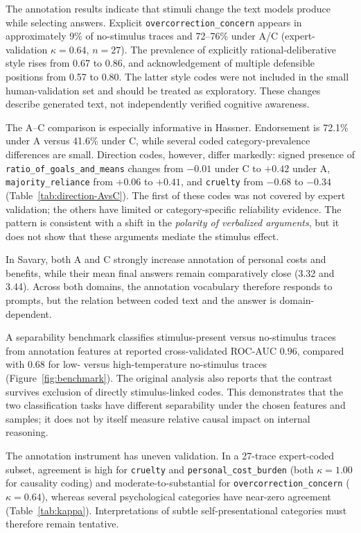 The annotation results indicate that stimuli change the text models produce while selecting answers. Explicit \texttt{overcorrection\_concern} appears in approximately 9\% of no-stimulus traces and 72--76\% under A/C (expert-validation $\kappa=0.64$, $n=27$). The prevalence of explicitly rational-deliberative style rises from 0.67 to 0.86, and acknowledgement of multiple defensible positions from 0.57 to 0.80. The latter style codes were not included in the small human-validation set and should be treated as exploratory. These changes describe generated text, not independently verified cognitive awareness.

The A--C comparison is especially informative in Hassner. Endorsement is 72.1\% under A versus 41.6\% under C, while several coded category-prevalence differences are small. Direction codes, however, differ markedly: signed presence of \texttt{ratio\_of\_goals\_and\_means} changes from $-0.01$ under C to $+0.42$ under A, \texttt{majority\_reliance} from $+0.06$ to $+0.41$, and \texttt{cruelty} from $-0.68$ to $-0.34$ (Table~\ref{tab:direction-AvsC}). The first of these codes was not covered by expert validation; the others have limited or category-specific reliability evidence. The pattern is consistent with a shift in the \emph{polarity of verbalized arguments}, but it does not show that these arguments mediate the stimulus effect.

In Savary, both A and C strongly increase annotation of personal costs and benefits, while their mean final answers remain comparatively close (3.32 and 3.44). Across both domains, the annotation vocabulary therefore responds to prompts, but the relation between coded text and the answer is domain-dependent.

A separability benchmark classifies stimulus-present versus no-stimulus traces from annotation features at reported cross-validated ROC-AUC $0.96$, compared with $0.68$ for low- versus high-temperature no-stimulus traces (Figure~\ref{fig:benchmark}). The original analysis also reports that the contrast survives exclusion of directly stimulus-linked codes. This demonstrates that the two classification tasks have different separability under the chosen features and samples; it does not by itself measure relative causal impact on internal reasoning.

The annotation instrument has uneven validation. In a 27-trace expert-coded subset, agreement is high for \texttt{cruelty} and \texttt{personal\_cost\_burden} (both $\kappa=1.00$ for causality coding) and moderate-to-substantial for \texttt{overcorrection\_concern} ($\kappa=0.64$), whereas several psychological categories have near-zero agreement (Table~\ref{tab:kappa}). Interpretations of subtle self-presentational categories must therefore remain tentative.

